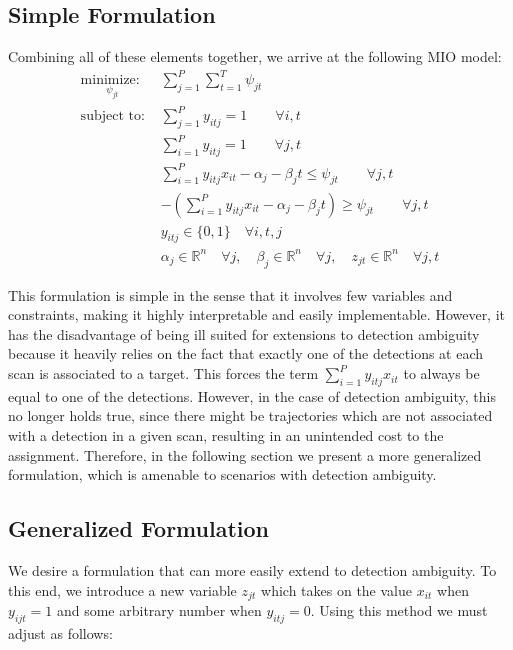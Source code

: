 \subsection{Simple Formulation}
Combining all of these elements together, we arrive at the following MIO model:
\begin{align*}
\underset{\psi_{jt}}{\text{minimize: }} & \sum_{j=1}^{P} \sum_{t=1}^{T} \psi_{jt} \\
\text{subject to: }	& \sum_{j=1}^{P} y_{itj} = 1 \qquad \forall i,t\\
				& \sum_{i=1}^{P} y_{itj} = 1 \qquad \forall j,t\\
				& \sum_{i=1}^{P}y_{itj}x_{it} - \alpha_{j} - \beta_{j}t \leq \psi_{jt} \qquad \forall j,t\\
				& -\left(\sum_{i=1}^{P}y_{itj}x_{it} - \alpha_{j} - \beta_{j}t\right) \geq \psi_{jt} \qquad \forall j,t\\
			 	& y_{itj} \in \{0,1\} \quad \forall i,t,j\\
				& \alpha_{j} \in \mathbb{R}^n \quad \forall j,\quad \beta_{j} \in \mathbb{R}^n \quad \forall j, \quad z_{jt} \in \mathbb{R}^n \quad \forall j,t
\end{align*}

This formulation is simple in the sense that it involves few variables and constraints, making it highly interpretable and easily implementable. However, it has the disadvantage of being ill suited for extensions to detection ambiguity because it heavily relies on the fact that exactly one of the detections at each scan is associated to a target. This forces the term $\sum_{i=1}^{P}y_{itj}x_{it}$ to always be equal to one of the detections. However, in the case of detection ambiguity, this no longer holds true, since there might be trajectories which are not associated with a detection in a given scan, resulting in an unintended cost to the assignment. Therefore, in the following section we present a more generalized formulation, which is amenable to scenarios with detection ambiguity.

\subsection{Generalized Formulation}
We desire a formulation that can more easily extend to detection ambiguity. To this end, we introduce a new variable $z_{jt}$ which takes on the value $x_{it}$ when $y_{ijt}=1$ and some arbitrary number when $y_{itj}=0$. Using this method we must adjust \label{eq:simple_objective} as follows:

